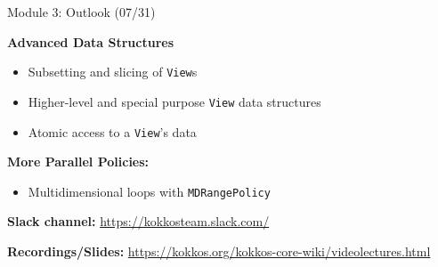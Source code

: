 \begin{frame}{Module 3: Outlook (07/31)}

	\vspace{10pt}
	\textbf{Advanced Data Structures}
	\begin{itemize}
        \item Subsetting and slicing of \texttt{View}s
        \item Higher-level and special purpose \texttt{View} data structures
        \item Atomic access to a \texttt{View}'s data
	\end{itemize}

	\vspace{10pt}
	\textbf{More Parallel Policies:}
	\begin{itemize}
		\item Multidimensional loops with \texttt{MDRangePolicy}
	\end{itemize}

	\vspace{10pt}
    \textbf{Slack channel:} {\scriptsize \url{https://kokkosteam.slack.com/}}
	
	\vspace{10pt}
	\textbf{Recordings/Slides:} {\scriptsize \url{https://kokkos.org/kokkos-core-wiki/videolectures.html}}

\end{frame}



